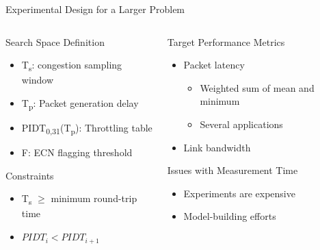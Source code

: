 \documentclass[10pt, compress, aspectratio=169, xcolor={table,usenames,dvipsnames}]{beamer}
\begin{document}
\begin{frame}[label={sec:org8305340}]{Experimental Design for a Larger Problem}
\begin{columns}
\begin{column}{0.5\columnwidth}
\begin{block}{Search Space Definition}
\begin{itemize}
\item T\textsubscript{s}: congestion sampling window
\item T\textsubscript{p}: Packet generation delay
\item PIDT\textsubscript{0,31}(T\textsubscript{p}): Throttling table
\item F: ECN flagging threshold
\end{itemize}
\begin{block}{Constraints}
\begin{itemize}
\item T\textsubscript{s} \(\ge\) minimum round-trip time
\item \(PIDT_i < PIDT_{i + 1}\)
\end{itemize}
\end{block}
\end{block}
\end{column}
\begin{column}{0.5\columnwidth}
\begin{block}{Target Performance Metrics}
\begin{itemize}
\item Packet latency
\begin{itemize}
\item Weighted sum of mean and minimum
\item Several applications
\end{itemize}
\item Link bandwidth
\end{itemize}
\begin{block}{Issues with Measurement Time}
\begin{itemize}
\item Experiments are expensive
\item Model-building efforts
\end{itemize}
\end{block}
\end{block}
\end{column}
\end{columns}
\end{frame}
\end{document}

